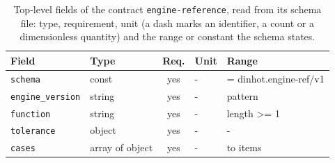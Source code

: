 \begin{table}[t]\centering\footnotesize
\caption{Top-level fields of the contract \texttt{engine-reference}, read from its schema file: type, requirement, unit (a dash marks an identifier, a count or a dimensionless quantity) and the range or constant the schema states.}\label{tab:contract-engine-reference}
\begin{tabular}{@{}l l c l >{\raggedright\arraybackslash}p{}@{}}\toprule Field & Type & Req. & Unit & Range\\\midrule
\texttt{\scriptsize schema} & const & yes & - & = dinhot.engine-ref/v1\\
\texttt{\scriptsize engine\_version} & string & yes & - & pattern\\
\texttt{\scriptsize function} & string & yes & - & length >= 1\\
\texttt{\scriptsize tolerance} & object & yes & - & -\\
\texttt{\scriptsize cases} & array of object & yes & - & 1 to items\\
\bottomrule\end{tabular}\end{table}
